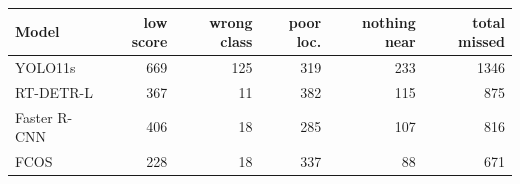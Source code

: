 \begin{tabular}{lrrrrr}
\toprule
Model & low score & wrong class & poor loc. & nothing near & total missed \\
\midrule
YOLO11s & 669 & 125 & 319 & 233 & 1346 \\
RT-DETR-L & 367 & 11 & 382 & 115 & 875 \\
Faster R-CNN & 406 & 18 & 285 & 107 & 816 \\
FCOS & 228 & 18 & 337 & 88 & 671 \\
\bottomrule
\end{tabular}
